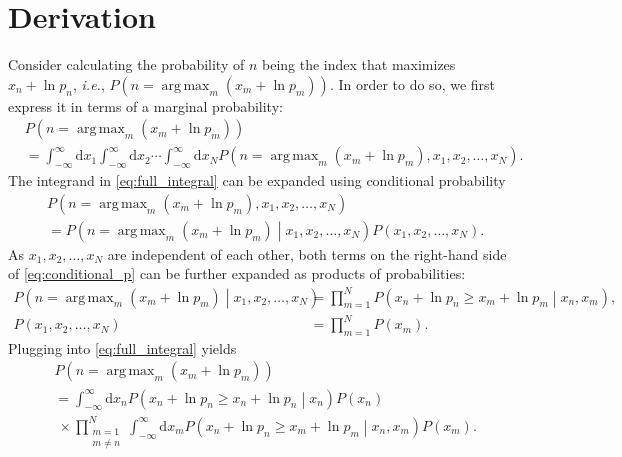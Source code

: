 \documentclass{book}[12pt]
\DeclareMathOperator*{\argmax}{arg\,max}
\begin{document}
\section*{Derivation}
Consider calculating the probability of $n$ being the index that maximizes $x_n+\ln p_n$, {\it i.e.}, $P\left(n=\argmax_m\left(x_m+\ln p_m\right)\right)$. In order to do so, we first express it in terms of a marginal probability:
\begin{align}
     & P\left(n=\argmax_m\left(x_m+\ln p_m\right)\right)\nonumber                                                                                                                                                   \\
     & =\int_{-\infty}^\infty\mathrm{d}x_1 \int_{-\infty}^\infty\mathrm{d}x_2\cdots \int_{-\infty}^\infty\mathrm{d}x_N P\left(n=\argmax_m\left(x_m+\ln p_m\right),x_1,x_2,\dots,x_N\right).\label{eq:full_integral}
\end{align}
The integrand in \cref{eq:full_integral} can be expanded using conditional probability
\begin{align}
     & P\left(n=\argmax_m\left(x_m+\ln p_m\right),x_1,x_2,\dots,x_N\right)\nonumber                                                        \\
     & =P\left(n=\argmax_m\left(x_m+\ln p_m\right)\middle|x_1,x_2,\dots,x_N\right)P\left(x_1,x_2,\dots,x_N\right)\label{eq:conditional_p}.
\end{align}
As $x_1,x_2,\dots,x_N$ are independent of each other, both terms on the right-hand side of \cref{eq:conditional_p} can be further expanded as products of probabilities:
\begin{align}
    P\left(n=\argmax_m\left(x_m+\ln p_m\right)\middle|x_1,x_2,\dots,x_N\right) & =\prod_{m=1}^N P\left(x_n+\ln p_n\geq x_m+\ln p_m\middle|x_n,x_m\right),\label{eq:expansion1} \\
    P\left(x_1,x_2,\dots,x_N\right)                                            & =\prod_{m=1}^N P\left(x_m\right).\label{eq:expansion2}
\end{align}
Plugging  into \cref{eq:full_integral} yields
\begin{align}
     & P\left(n=\argmax_m\left(x_m+\ln p_m\right)\right)\nonumber                                                           \\
     & =\int_{-\infty}^\infty\mathrm{d}x_n P\left(x_n+\ln p_n\geq x_n+\ln p_n\middle|x_n\right) P\left(x_n\right) \nonumber \\
     & ~\times\prod_{\substack{m=1                                                                                          \\m\neq n}}^N \int_{-\infty}^\infty\mathrm{d}x_m P\left(x_n+\ln p_n\geq x_m+\ln p_m\middle|x_n,x_m\right) P\left(x_m\right).\label{eq:expanded_integral}
\end{align}
\end{document}
